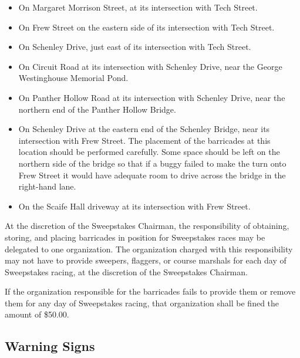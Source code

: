 	\begin{itemize}

		\item On Margaret Morrison Street, at its intersection with Tech Street.

		\item On Frew Street on the eastern side of its intersection with Tech
		Street.

		\item On Schenley Drive, just east of its intersection with Tech Street.

		\item On Circuit Road at its intersection with Schenley Drive, near the
		George Westinghouse Memorial Pond.

		\item On Panther Hollow Road at its intersection with Schenley Drive, near
		the northern end of the Panther Hollow Bridge.

		\item On Schenley Drive at the eastern end of the Schenley Bridge, near its
		intersection with Frew Street. The placement of the barricades at this location
		should be performed carefully. Some space should be left on the northern side
		of the bridge so that if a buggy failed to make the turn onto Frew Street it
		would have adequate room to drive across the bridge in the right-hand lane.

		\item On the Scaife Hall driveway at its intersection with Frew Street.

	\end{itemize}

	At the discretion of the Sweepstakes Chairman, the responsibility of obtaining,
	storing, and placing barricades in position for Sweepstakes races may be
	delegated to one organization. The organization charged with this
	responsibility may not have to provide sweepers, flaggers, or course marshals
	for each day of Sweepstakes racing, at the discretion of the Sweepstakes
	Chairman.

	If the organization responsible for the barricades fails to provide them or
	remove them for any day of Sweepstakes racing, that organization shall be fined
	the amount of \$50.00.

\subsection{Warning Signs}

